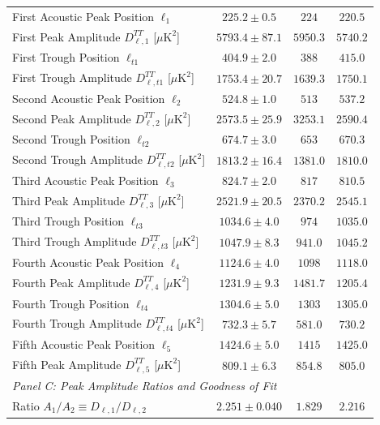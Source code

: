 \documentclass[aps,prd,reprint,superscriptaddress,nofootinbib,twocolumn]{revtex4-2}
\begin{document}
\begin{table}[t]
\begin{ruledtabular}
\begin{tabular}{lccc}
First Acoustic Peak Position $\ell_1$ & $225.2 \pm 0.5$ & $224$ & $220.5$ \\
First Peak Amplitude $D_{\ell, 1}^{TT}$ [$\mu\text{K}^2$] & $5793.4 \pm 87.1$ & $5950.3$ & $5740.2$ \\
First Trough Position $\ell_{t1}$ & $404.9 \pm 2.0$ & $388$ & $415.0$ \\
First Trough Amplitude $D_{\ell, t1}^{TT}$ [$\mu\text{K}^2$] & $1753.4 \pm 20.7$ & $1639.3$ & $1750.1$ \\
Second Acoustic Peak Position $\ell_2$ & $524.8 \pm 1.0$ & $513$ & $537.2$ \\
Second Peak Amplitude $D_{\ell, 2}^{TT}$ [$\mu\text{K}^2$] & $2573.5 \pm 25.9$ & $3253.1$ & $2590.4$ \\
Second Trough Position $\ell_{t2}$ & $674.7 \pm 3.0$ & $653$ & $670.3$ \\
Second Trough Amplitude $D_{\ell, t2}^{TT}$ [$\mu\text{K}^2$] & $1813.2 \pm 16.4$ & $1381.0$ & $1810.0$ \\
Third Acoustic Peak Position $\ell_3$ & $824.7 \pm 2.0$ & $817$ & $810.5$ \\
Third Peak Amplitude $D_{\ell, 3}^{TT}$ [$\mu\text{K}^2$] & $2521.9 \pm 20.5$ & $2370.2$ & $2545.1$ \\
Third Trough Position $\ell_{t3}$ & $1034.6 \pm 4.0$ & $974$ & $1035.0$ \\
Third Trough Amplitude $D_{\ell, t3}^{TT}$ [$\mu\text{K}^2$] & $1047.9 \pm 8.3$ & $941.0$ & $1045.2$ \\
Fourth Acoustic Peak Position $\ell_4$ & $1124.6 \pm 4.0$ & $1098$ & $1118.0$ \\
Fourth Peak Amplitude $D_{\ell, 4}^{TT}$ [$\mu\text{K}^2$] & $1231.9 \pm 9.3$ & $1481.7$ & $1205.4$ \\
Fourth Trough Position $\ell_{t4}$ & $1304.6 \pm 5.0$ & $1303$ & $1305.0$ \\
Fourth Trough Amplitude $D_{\ell, t4}^{TT}$ [$\mu\text{K}^2$] & $732.3 \pm 5.7$ & $581.0$ & $730.2$ \\
Fifth Acoustic Peak Position $\ell_5$ & $1424.6 \pm 5.0$ & $1415$ & $1425.0$ \\
Fifth Peak Amplitude $D_{\ell, 5}^{TT}$ [$\mu\text{K}^2$] & $809.1 \pm 6.3$ & $854.8$ & $805.0$ \\
\midrule
\multicolumn{4}{l}{\textit{Panel C: Peak Amplitude Ratios and Goodness of Fit}} \\
Ratio $A_1 / A_2 \equiv D_{\ell, 1} / D_{\ell, 2}$ & $2.251 \pm 0.040$ & $1.829$ & $2.216$ \\

\end{tabular}
\end{ruledtabular}
\end{table}
\end{document}

